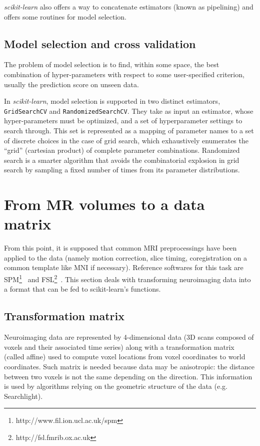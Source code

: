 \documentclass{frontiersSCNS} %
\begin{document}
{\em scikit-learn} also offers a way to concatenate estimators (known as
pipelining) and offers some routines for model selection.

\subsection{Model selection and cross validation}

The problem of model selection is to find, within some space, the best
combination of hyper-parameters with respect to some user-specified criterion,
usually the prediction score on unseen data.

In {\em scikit-learn}, model selection is supported in two distinct
estimators, \texttt{GridSearchCV} and \texttt{RandomizedSearchCV}.  They take
as input an estimator, whose hyper-parameters must be
optimized, and a set of hyperparameter settings to search through. This set is
represented as a mapping of parameter names to a set of discrete choices in
the case of grid search, which exhaustively enumerates the ``grid'' (cartesian
product) of complete parameter combinations. Randomized search is a smarter
algorithm that avoids the combinatorial explosion in grid search by sampling a
fixed number of times from its parameter distributions.

\section{From MR volumes to a data matrix}

From this point, it is supposed that common MRI preprocessings have been applied
to the data (namely motion correction, slice timing, coregistration on a common template like
MNI if necessary). Reference softwares for this task are
SPM\footnote{http://www.fil.ion.ucl.ac.uk/spm}~\cite{friston2007} and
FSL\footnote{http://fsl.fmrib.ox.ac.uk}~\cite{smith2004}.
This section deals with transforming neuroimaging data into a format that can be
fed to scikit-learn's functions.


\subsection{Transformation matrix}

Neuroimaging data are represented by 4-dimensional data (3D scans composed of
voxels and their associated time series) along with a transformation matrix
(called affine) used to compute voxel locations from voxel coordinates to
world coordinates.
Such matrix is needed because data may be anisotropic: the distance between
two voxels is not the same depending on the direction.
This information is used by algorithms relying on the geometric structure of the
data (e.g. Searchlight).
\end{document}
